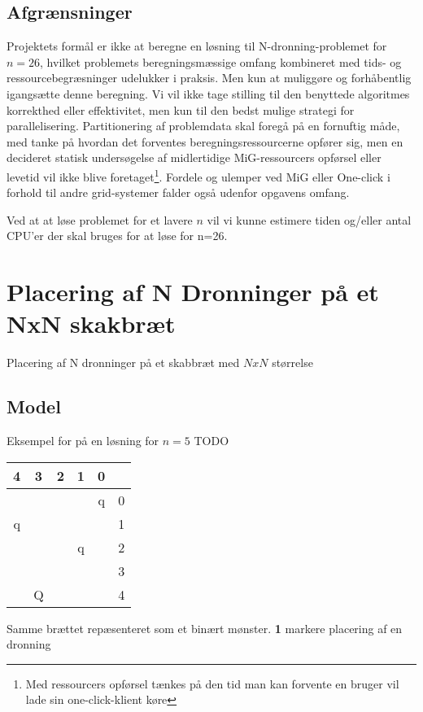 \documentclass[a4,10pt]{article}
\def\chs#1{{\chessfont#1}}
\begin{document}
\subsection{Afgrænsninger}
%

Projektets formål er ikke at beregne en løsning til N-dronning-problemet for $n=26$, hvilket problemets beregningsmæssige omfang kombineret med tids- og ressourcebegræsninger udelukker i praksis. Men kun at muliggøre og forhåbentlig igangsætte denne beregning. 
Vi vil ikke tage stilling til den benyttede algoritmes korrekthed eller effektivitet, men kun til den bedst mulige strategi for parallelisering. Partitionering af problemdata skal foregå på en fornuftig måde, med tanke på hvordan det forventes beregningsressourcerne opfører sig, men en decideret statisk undersøgelse af midlertidige MiG-ressourcers opførsel eller levetid vil ikke blive foretaget\footnote{Med ressourcers opførsel tænkes på den tid man kan forvente en bruger vil lade sin one-click-klient køre}. Fordele og ulemper ved MiG eller One-click i forhold til andre grid-systemer falder også udenfor opgavens omfang. 

Ved at at løse problemet for et lavere $n$ vil vi kunne estimere tiden og/eller antal CPU'er der skal bruges for at løse for n=26.

\section{Placering af N Dronninger på et NxN skakbræt}

Placering af N dronninger på et skabbræt med $NxN$ størrelse
	
\subsection{Model}
Eksempel for på en løsning for $n=5$
TODO
\begin{tabular}{|c|c|c|c|c|l}
       4 & 3 & 2 & 1 &  0 & \\
\hline &  &  &  & \chs{q} & 0 \\
\hline \chs{q} &  &  &  &  		  & 1 \\
\hline &  &  & \chs{q} &  & 2\\
\hline &  &  &  &  		  & 3 \\
\hline & Q &  &  &  		  & 4\\
\hline
\end{tabular}

Samme brættet repæsenteret som et binært mønster. \textbf{1} markere  placering af en dronning 
\end{document}
